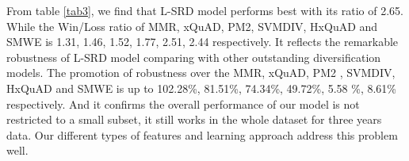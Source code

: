 \documentclass[review]{elsarticle}
\begin{document}



From table \ref{tab3}, we find that L-SRD model performs best with its ratio of 2.65. While the Win/Loss ratio of MMR, xQuAD, PM2, SVMDIV, HxQuAD and SMWE is 1.31, 1.46, 1.52, 1.77, 2.51, 2.44 respectively. It reflects the remarkable robustness of L-SRD model comparing with other outstanding diversification models. The promotion of robustness over the MMR, xQuAD, PM2 , SVMDIV, HxQuAD and SMWE is up to 102.28\%, 81.51\%, 74.34\%, 49.72\%, 5.58 \%, 8.61\% respectively. And it confirms the overall performance of our model is not restricted to a small subset, it still works in the whole dataset for three years data. Our different types of features and learning approach address this problem well.


\iffalse
\end{document}
